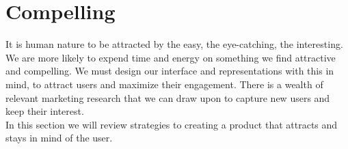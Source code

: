 \section{Compelling}
It is human nature to be attracted by the easy, the eye-catching, the interesting. We are more likely to expend time and energy 
on something we find attractive and compelling. We must design our interface and representations with this in mind, to attract users and maximize their engagement. 
There is a wealth of relevant marketing research that we can draw upon to capture new users and keep their interest.\\


In this section we will review strategies to creating a product that attracts and stays in mind
of the user.






